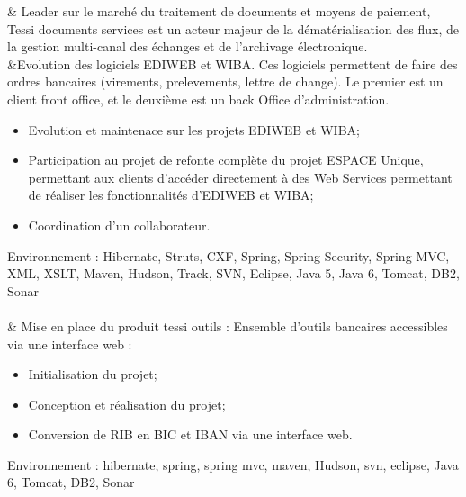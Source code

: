 
			   & Leader sur le marché du traitement de documents et moyens de paiement, 
			   Tessi documents services est un acteur majeur de la dématérialisation des flux, 
			   de la gestion multi-canal des échanges et de l'archivage électronique. \\%
			   &Evolution des logiciels EDIWEB et WIBA. Ces logiciels permettent de faire des ordres bancaires (virements, prelevements, lettre de change).
			   Le premier est un client front office, et le deuxième est un back Office d'administration.
			   \begin{itemize}%
    				\item Evolution et maintenace sur les projets EDIWEB et WIBA;%
    				\item Participation au projet de refonte complète du projet ESPACE Unique, permettant aux clients d'accéder 
    				directement à des Web Services permettant de réaliser les fonctionnalités d'EDIWEB et WIBA;%
    				\item Coordination d'un collaborateur.%
			   \end{itemize}%
Environnement : Hibernate, Struts, CXF, Spring, Spring Security, Spring MVC, XML, XSLT, Maven, Hudson, Track, SVN, Eclipse, Java 5, Java 6, Tomcat, DB2, Sonar \\\\

& Mise en place du produit tessi outils : Ensemble d'outils bancaires accessibles via une interface web :%
			   \begin{itemize}%
    				\item Initialisation du projet;%
    				\item Conception et réalisation du projet;%
    				\item Conversion de RIB en BIC et IBAN via une interface web.%
			   \end{itemize}%
Environnement : hibernate, spring, spring mvc, maven, Hudson, svn, eclipse, Java 6, Tomcat, DB2, Sonar \\\\
